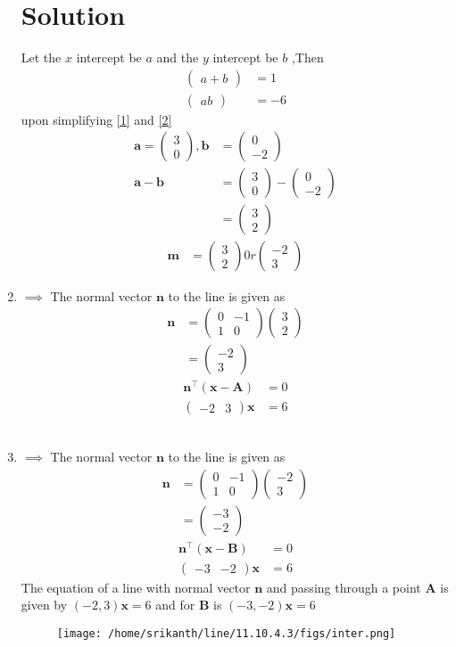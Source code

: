 \documentclass[12pt]{article}
\providecommand{\brak}[1]{\ensuremath{\left(#1\right)}}
\newcommand{\myvec}[1]{\ensuremath{\begin{pmatrix}#1\end{pmatrix}}}
\let\vec\mathbf
\begin{document}
\begin{enumerate}
\section{Solution}
Let the $x$ intercept be $a$ and  the $y$ intercept be $b$ ,Then
\begin{align}
\myvec{a+b}&=1\label{1}\\
\myvec{ab}&=-6 \label{2}
\end{align}
upon simplifying \eqref{1} and \eqref{2}
\begin{align}
\vec{a}=\myvec{3\\0},\vec{b}&=\myvec{0\\-2}\\
\vec{a-b}&=\myvec{3\\0}-\myvec{0\\-2}\\
&=\myvec{3\\2}
\end{align}
\begin{align}		
\vec{m}&=\myvec{3\\2}0r \myvec{-2\\3}
\end{align}
\item 
$\implies$ The normal vector $\vec{n}$ to the line is given as
\begin{align}
\vec{n}&=\myvec{0&-1\\1&0}\myvec{3\\2}\\
&=\myvec{-2 \\3} 
\end{align}
\begin{align}
	\vec{n}^\top\brak{\vec{x}-\vec{A}} &= 0 \\
	\myvec { -2 & 3 } \vec{x}  &= 6  
\end{align}
   \\
\item 
$\implies$ The normal vector $\vec{n}$ to the line is given as
\begin{align}
\vec{n}&=\myvec{0&-1\\1&0}\myvec{-2\\3}\\
&=\myvec{-3 \\-2} 
\end{align}
\begin{align}
    \vec{n}^\top\brak{\vec{x}-\vec{B}} &= 0 \\  
	\myvec { -3 & -2 }  \vec{x}  &= 6        
\end{align}
The equation of a line with normal vector $\vec{n}$ and passing through a point $\vec{A}$ is given by $(-2,3)\vec{x}=6$ and for $\vec{B}$ is $(-3,-2)\vec{x}=6$
\begin{figure}[h!]
\centering
\texttt{[image: /home/srikanth/line/11.10.4.3/figs/inter.png]}
\caption{}
\label{fig:line segment}
\end{figure}
\end{enumerate}
\end{document}
